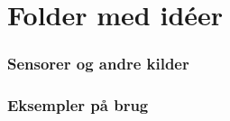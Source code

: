 \section{Folder med idéer}

\begin{frame}
\frametitle{Sensorer og andre kilder}

\end{frame}

\begin{frame}
\frametitle{Eksempler på brug}

\end{frame}